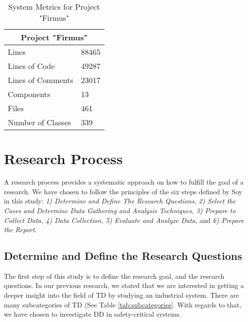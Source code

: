 \begin{table}[]
\centering
\caption{System Metrics for Project "Firmus"}
\label{tab:systemmetrics}
\begin{tabular}{|l|l|}
\multicolumn{2}{c}{\textbf{Project "Firmus"}} \\ \hline
Lines                      & 88465          \\ \hline
Lines of Code              & 49287          \\ \hline
Lines of Comments          & 23017          \\ \hline
Components                 & 13             \\ \hline
Files                      & 461            \\ \hline
Number of Classes          & 339           \\ \hline
\end{tabular}
\end{table}




% 


\section{Research Process}
\label{sec:researchprocess}
A research process provides a systematic approach on how to fulfill the goal of a research. We have chosen to follow the principles of the six steps defined by Soy\cite{soysusan} in this study: \textit{1) Determine and Define The Research Questions, 2) Select the Cases and Determine Data Gathering and Analysis Techniques, 3) Prepare to Collect Data, 4) Data Collection, 5) Evaluate and Analyze Data}, and \textit{6) Prepare the Report}.


\subsection{Determine and Define the Research Questions} %
\label{subsec:rq}
The first step of this study is to define the research goal, and the research questions. In our previous research\cite{forprosjekt}, we stated that we are interested in getting a deeper insight into the field of TD by studying an industrial system. There are many subcategories of TD (See Table \ref{tab:subcategories}. With regards to that, we have chosen to investigate DD in safety-critical systems.


